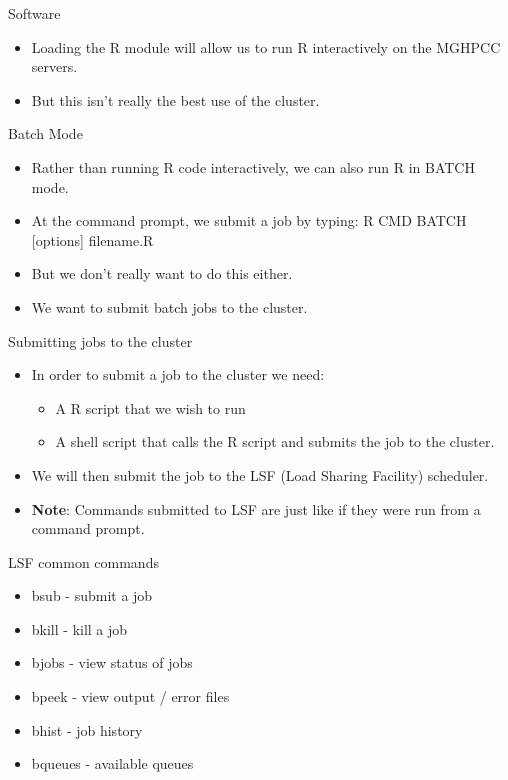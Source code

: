 \documentclass[table]{beamer}\usepackage[]{graphicx}\usepackage[]{color}
\begin{document}
\begin{frame}{Software}
\begin{itemize}
\item Loading the R module will allow us to run R interactively on the MGHPCC servers.  
\item But this isn't really the best use of the cluster.  
\end{itemize}
\end{frame}

\begin{frame}{Batch Mode}
\begin{itemize}
\item Rather than running R code interactively, we can also run R in BATCH mode.  
\item At the command prompt, we submit a job by typing: R CMD BATCH [options] filename.R
\item But we don't really want to do this either.  
\item We want to submit batch jobs to the cluster.  
\end{itemize}
\end{frame}

\begin{frame}{Submitting jobs to the cluster}
\begin{itemize}
\item In order to submit a job to the cluster we need: 
\begin{itemize}
\item A R script that we wish to run
\item A shell script that calls the R script and submits the job to the cluster.  
\end{itemize}
\item We will then submit the job to the LSF (Load Sharing Facility) scheduler.  
\item {\bf Note}: Commands submitted to LSF are just like if they were run from a command prompt. 
\end{itemize}
\end{frame}


\begin{frame}{LSF common commands}
\begin{itemize}
\item bsub - submit a job
\item bkill - kill a job
\item bjobs - view status of jobs
\item bpeek - view output / error files
\item bhist - job history
\item bqueues - available queues
\end{itemize}
\end{frame}
\end{document}
